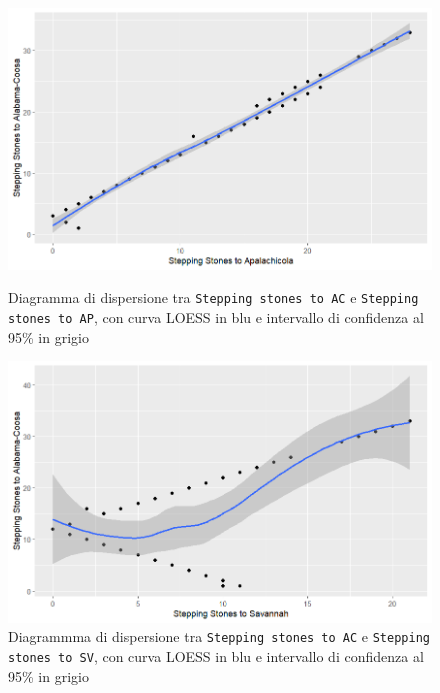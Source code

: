 \documentclass{article} %
\begin{document}
\begin{figure}[H]
    \centering
    \begin{minipage}{0.49\textwidth}
        \centering
        \includegraphics[width=\textwidth]{immagini/ac_ap.png}
        \captionsetup{justification=centering}
        \caption{Diagramma di dispersione tra \texttt{Stepping stones to AC} e \texttt{Stepping stones to AP}, con curva LOESS in blu e intervallo di confidenza al 95\% in grigio}
    \end{minipage}
    \hfill
    \begin{minipage}{0.49\textwidth}
        \centering
        \includegraphics[width=\textwidth]{immagini/ac_sv.png}
        \captionsetup{justification=centering}
        \caption{Diagrammma di dispersione tra \texttt{Stepping stones to AC} e \texttt{Stepping stones to SV}, con curva LOESS in blu e intervallo di confidenza al 95\% in grigio}
    \end{minipage}    
\end{figure}
\end{document}
